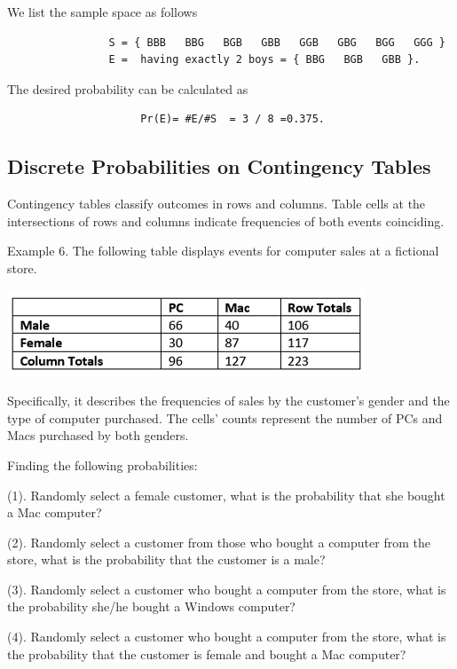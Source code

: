 \documentclass[
]{book}
\begin{document}
We list the sample space as follows

\begin{verbatim}
                S = { BBB   BBG   BGB   GBB   GGB   GBG   BGG   GGG }
                E =  having exactly 2 boys = { BBG   BGB   GBB }. 
\end{verbatim}

The desired probability can be calculated as

\begin{verbatim}
                     Pr(E)= #E/#S  = 3 / 8 =0.375.
\end{verbatim}

\hypertarget{discrete-probabilities-on-contingency-tables}{%
\subsection{Discrete Probabilities on Contingency Tables}\label{discrete-probabilities-on-contingency-tables}}

Contingency tables classify outcomes in rows and columns. Table cells at the intersections of rows and columns indicate frequencies of both events coinciding.

Example 6. The following table displays events for computer sales at a fictional store.

\begin{center}\includegraphics[width=0.5\linewidth]{week03/contingencyTable} \end{center}

Specifically, it describes the frequencies of sales by the customer's gender and the type of computer purchased. The cells' counts represent the number of PCs and Macs purchased by both genders.

Finding the following probabilities:

(1). Randomly select a female customer, what is the probability that she bought a Mac computer?

(2). Randomly select a customer from those who bought a computer from the store, what is the probability that the customer is a male?

(3). Randomly select a customer who bought a computer from the store, what is the probability she/he bought a Windows computer?

(4). Randomly select a customer who bought a computer from the store, what is the probability that the customer is female and bought a Mac computer?
\end{document}
